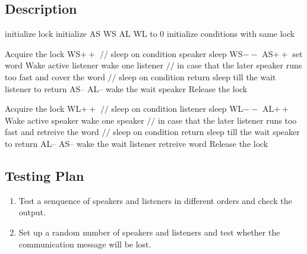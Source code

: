 \documentclass{article}
\begin{document}
\subsection{Description}
\begin{algorithm}
  \begin{algorithmic}
			\State initialize lock
			\State initialize AS WS AL WL to 0
			\State initialize conditions with same lock
		\EndProcedure
  \end{algorithmic}
	\begin{algorithmic}
			\State Acquire the lock
				\State WS$++$
				\State $//$ sleep on condition speaker
				\State sleep
				\State WS$--$
			\EndWhile
			\State AS$++$
			\State set word
				\State Wake active listener
			\Else
					\State wake one listener
				\EndIf
				\State $//$ in case that the later speaker runs too fast and cover the word
				\State $//$ sleep on condition return
				\State sleep till the wait listener to return 		
				\State AS--
				\State AL--
					\State wake the wait speaker
				\EndIf
			\EndIf
			\State Release the lock
			\State \Return
		\EndProcedure
  \end{algorithmic}
\end{algorithm}
\begin{algorithm}
	\begin{algorithmic}
			\State Acquire the lock
				\State WL$++$
				\State $//$ sleep on condition listener
				\State sleep
				\State WL$--$
			\EndWhile
			\State AL$++$
				\State Wake active speaker
			\Else
					\State wake one speaker
				\EndIf
				\State $//$ in case that the later listener runs too fast and retreive the word
				\State $//$ sleep on condition return
				\State sleep till the wait speaker to return 		
				\State AL--
				\State AS--
					\State wake the wait listener
				\EndIf
			\EndIf
			\State retreive word
			\State Release the lock
			\State \Return
		\EndProcedure
  \end{algorithmic}
\end{algorithm}
\subsection{Testing Plan}
\begin{enumerate}
	\item Test a senquence of speakers and listeners in different orders and check the output.
	\item Set up a random number of speakers and listeners and test whether the communication message will be lost.
\end{enumerate}
\end{document}
